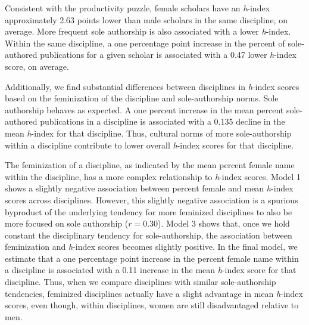 \documentclass[
  10pt,
  letterpaper,
]{article}
\begin{document}
\begin{table}
{}

\end{table}%

Consistent with the productivity puzzle, female scholars have an
\emph{h}-index approximately 2.63 points lower than male scholars in the
same discipline, on average. More frequent sole authorship is also
associated with a lower \emph{h}-index. Within the same discipline, a
one percentage point increase in the percent of sole-authored
publications for a given scholar is associated with a 0.47 lower
\emph{h}-index score, on average.

Additionally, we find substantial differences between disciplines in
\emph{h}-index scores based on the feminization of the discipline and
sole-authorship norms. Sole authorship behaves as expected. A one
percent increase in the mean percent sole-authored publications in a
discipline is associated with a 0.135 decline in the mean \emph{h}-index
for that discipline. Thus, cultural norms of more sole-authorship within
a discipline contribute to lower overall \emph{h}-index scores for that
discipline.

The feminization of a discipline, as indicated by the mean percent
female name within the discipline, has a more complex relationship to
\emph{h}-index scores. Model 1 shows a slightly negative association
between percent female and mean \emph{h}-index scores across
disciplines. However, this slightly negative association is a spurious
byproduct of the underlying tendency for more feminized disciplines to
also be more focused on sole authorship (\(r=0.30\)). Model 3 shows
that, once we hold constant the disciplinary tendency for
sole-authorship, the association between feminization and \emph{h}-index
scores becomes slightly positive. In the final model, we estimate that a
one percentage point increase in the percent female name within a
discipline is associated with a 0.11 increase in the mean \emph{h}-index
score for that discipline. Thus, when we compare disciplines with
similar sole-authorship tendencies, feminized disciplines actually have
a slight advantage in mean \emph{h}-index scores, even though, within
disciplines, women are still disadvantaged relative to men.
\end{document}
